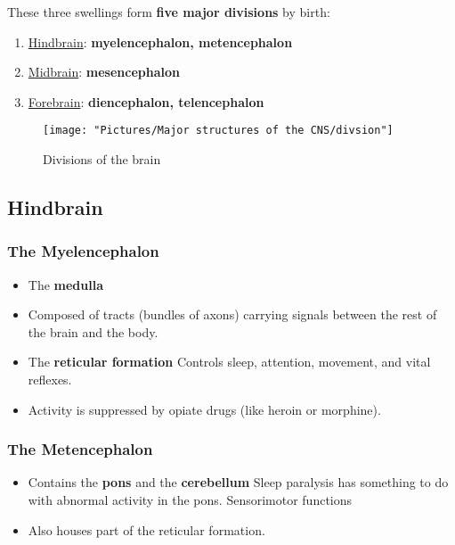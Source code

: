 \documentclass[12pt,a4paper]{article}
\begin{document}
	These three swellings form \textbf{five major divisions} by birth:
	
	\begin{enumerate}
		\item \underline{Hindbrain}: \textbf{myelencephalon, metencephalon}
		\item \underline{Midbrain}: \textbf{mesencephalon}
		\item \underline{Forebrain}: \textbf{diencephalon, telencephalon}
	\end{enumerate}	
	
	
\begin{figure}
	\centering
	\texttt{[image: "Pictures/Major structures of the CNS/divsion"]}
	\caption{Divisions of the brain}
	\label{fig:divsion}
\end{figure}
	
	\subsection{Hindbrain}
	\subsubsection{The Myelencephalon}
	
	\begin{itemize}
		\item The \textbf{medulla}
		\item Composed of tracts (bundles of axons) carrying signals between the rest of the brain and the body. 
		\item The \textbf{reticular formation}
		\subitem Controls sleep, attention, movement, and vital reflexes. 
		\item Activity is suppressed by opiate drugs (like heroin or morphine).
	\end{itemize}
	
	\subsubsection{The Metencephalon}
	\begin{itemize}
		\item Contains the \textbf{pons} and the \textbf{cerebellum}
		\subitem Sleep paralysis has something to do with abnormal activity in the pons. 
		\subitem Sensorimotor functions
		\item Also houses part of the reticular formation. 
	\end{itemize}
	
\end{document}
